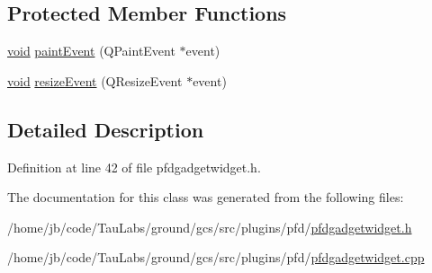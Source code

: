 \subsection*{\-Protected \-Member \-Functions}
\begin{DoxyCompactItemize}
\item 
\hyperlink{group___u_a_v_objects_plugin_ga444cf2ff3f0ecbe028adce838d373f5c}{void} \hyperlink{group___o_p_map_plugin_gaf2685b40cf25a74f35cc9829ca64c774}{paint\-Event} (\-Q\-Paint\-Event $\ast$event)
\item 
\hyperlink{group___u_a_v_objects_plugin_ga444cf2ff3f0ecbe028adce838d373f5c}{void} \hyperlink{group___o_p_map_plugin_gabdb991171226a4eea59b92bc2daf7bc9}{resize\-Event} (\-Q\-Resize\-Event $\ast$event)
\end{DoxyCompactItemize}


\subsection{\-Detailed \-Description}


\-Definition at line 42 of file pfdgadgetwidget.\-h.



\-The documentation for this class was generated from the following files\-:\begin{DoxyCompactItemize}
\item 
/home/jb/code/\-Tau\-Labs/ground/gcs/src/plugins/pfd/\hyperlink{pfdgadgetwidget_8h}{pfdgadgetwidget.\-h}\item 
/home/jb/code/\-Tau\-Labs/ground/gcs/src/plugins/pfd/\hyperlink{pfdgadgetwidget_8cpp}{pfdgadgetwidget.\-cpp}\end{DoxyCompactItemize}
